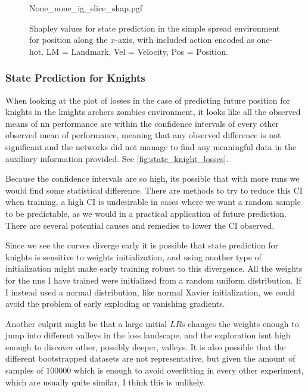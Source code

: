 \documentclass[UKenglish]{uiomasterthesis}
\begin{document}
\begin{figure}[H]
\centering
{None_none_ig_slice_shap.pgf}
\caption{Shapley values for state prediction in the simple spread environment for position along the $x$-axis, with included action encoded as one-hot. LM = Landmark, Vel = Velocity, Pos = Position.}
\label{fig:event_kaz_knight_ig_slice}
\end{figure}


\subsubsection{State Prediction for Knights}
When looking at the plot of losses in the case of predicting future position for knights in the knights archers zombies environment, it looks like all the observed means of \ac{nn} performance are within the confidence intervals of every other observed mean of performance, meaning that any observed difference is not significant and the networks did not manage to find any meaningful data in the auxiliary information provided. See \cref{fig:state_knight_losses}.

Because the confidence intervals are so high, its possible that with more runs we would find some statistical difference. There are methods to try to reduce this CI when training, a high CI is undesirable in cases where we want a random sample to be predictable, as we would in a practical application of future prediction. There are several potential causes and remedies to lower the CI observed. 

Since we see the curves diverge early it is possible that state prediction for knights is sensitive to weights initialization, and using another type of initialization might make early training robust to this divergence. All the weights for the \acp{nn} I have trained were initialized from a random uniform distribution. If I instead used a normal distribution, like normal Xavier initialization, we could avoid the problem of early exploding or vanishing gradients\cite{xavier_init}.

Another culprit might be that a large initial $LR$s changes the weights enough to jump into different valleys in the loss landscape, and the exploration isnt high enough to discover other, possibly deeper, valleys. It is also possible that the different bootstrapped datasets are not representative, but given the amount of samples of $100000$ which is enough to avoid overfitting in every other experiment, which are usually quite similar, I think this is unlikely.
\end{document}
